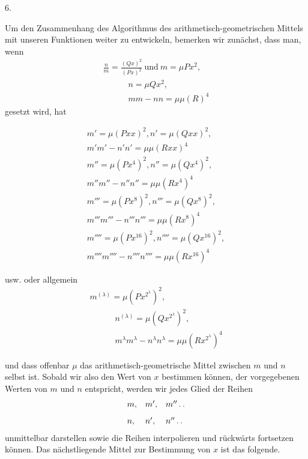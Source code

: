 \begingroup
\renewcommand{\arraystretch}{1.45}

\par\medskip{}\centerline{6.}\nobreak\smallskip
Um den Zusammenhang des Algorithmus des arithmetisch-geometrischen Mittels mit unseren Funktionen weiter zu entwickeln, bemerken wir zunächst, dass man, wenn
\[
\begin{gathered}\frac{n}{m}=\frac{(Qx)^2}{(Px)^2}\ \text{und}\ m=\mu Px^2,\\[8pt]\quad{}\qquad n=\mu Qx^2,\\[8pt]\quad{}\qquad mm-nn=\mu\mu(R)^4\end{gathered}
\]
gesetzt wird, hat



\[
\begin{gathered}
m'=\mu(Pxx)^2, n'=\mu(Qxx)^2,\\[6pt]m'm'-n'n'=\mu\mu(Rxx)^4\\[8pt]
m''=\mu(Px^4)^2,n''=\mu(Qx^4)^2,\\[6pt]m''m''-n''n''=\mu\mu(Rx^4)^4\\[8pt]
m'''=\mu(Px^8)^2,n'''=\mu(Qx^8)^2,\\[6pt]m'''m'''-n'''n'''=\mu\mu(Rx^8)^4\\[8pt]
m''''=\mu(Px^{16})^2,n''''=\mu(Qx^{16})^2,\\[6pt]m''''m''''-n''''n''''=\mu\mu(Rx^{16})^4
\end{gathered}
\]

usw. oder allgemein
\[
\begin{gathered}m^{(\lambda)}=\mu(Px^{2^\lambda})^2,\\[8pt]\quad{}\qquad
n^{(\lambda)}=\mu(Qx^{2^\lambda})^2,\\[8pt]\quad{}\qquad
m^\lambda m^\lambda-n^\lambda n^\lambda=\mu\mu(Rx^{2^\lambda})^4\end{gathered}
\]

und dass offenbar $\mu$ das arithmetisch-geometrische Mittel zwischen $m$ und $n$ selbst ist. Sobald wir also den Wert von $x$ bestimmen können, der vorgegebenen Werten von $m$ und $n$ entspricht, werden wir jedes Glied der Reihen
\[
\begin{array}{lll}
m,&m',&m''\mathinner{.\,.}\\[8pt]
n,&n',&n''\mathinner{.\,.}
\end{array}
\]
unmittelbar darstellen sowie die Reihen interpolieren und rückwärts fortsetzen können. Das nächstliegende Mittel zur Bestimmung von $x$ ist das folgende.


